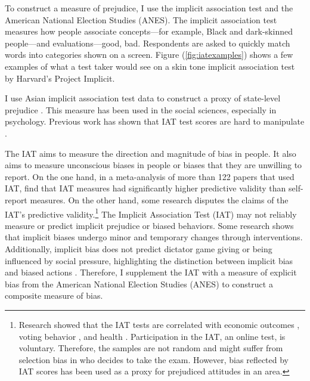 To construct a measure of prejudice, I use the implicit association test and the American National Election Studies (ANES). The implicit association test measures how people associate concepts---for example, Black and dark-skinned people---and evaluations---good, bad. Respondents are asked to quickly match words into categories shown on a screen. Figure (\ref{fig:iatexamples}) shows a few examples of what a test taker would see on a skin tone implicit association test by Harvard's Project Implicit.

I use Asian implicit association test data to construct a proxy of state-level prejudice \autocite{greenwaldMeasuringIndividualDifferences1998}. This measure has been used in the social sciences, especially in psychology. Previous work has shown that IAT test scores are hard to manipulate \autocite{egloffPredictiveValidityImplicit2002}.

The IAT aims to measure the direction and magnitude of bias in people. It also aims to measure unconscious biases in people or biases that they are unwilling to report. On the one hand, in a meta-analysis of more than 122 papers that used IAT, \textcite{greenwaldMeasuringIndividualDifferences1998} find that IAT measures had significantly higher predictive validity than self-report measures. On the other hand, some research disputes the claims of the IAT's predictive validity.\footnote{Research showed that the IAT tests are correlated with economic outcomes \autocite{chettyRaceEconomicOpportunity2020,gloverDiscriminationSelfFulfillingProphecy2017}, voting behavior \autocite{friesePredictingVotingBehavior2007}, and health \autocite{leitnerRacialBiasAssociated2016}. Participation in the IAT, an online test, is voluntary. Therefore, the samples are not random and might suffer from selection bias in who decides to take the exam. However, bias reflected by IAT scores has been used as a proxy for prejudiced attitudes in an area\autocite{chettyRaceEconomicOpportunity2020}.} The Implicit Association Test (IAT) may not reliably measure or predict implicit prejudice or biased behaviors. Some research shows that implicit biases undergo minor and temporary changes through interventions. Additionally, implicit bias does not predict dictator game giving or being influenced by social pressure, highlighting the distinction between implicit bias and biased actions \autocite{arkesAttributionsImplicitPrejudice2004,forscherMetaanalysisProceduresChange2019,leeDoesImplicitBias2018}. Therefore, I supplement the IAT with a measure of explicit bias from the American National Election Studies (ANES) to construct a composite measure of bias. 

